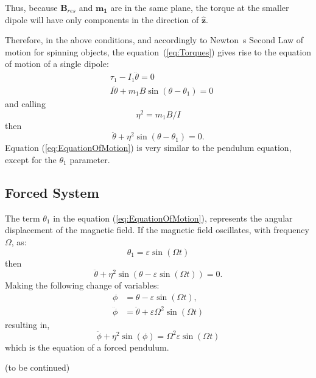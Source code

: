 Thus, because $\boldsymbol{B}_{res}$ and $\boldsymbol{m_1}$ are in the same plane, the torque at the smaller dipole will have only components in the direction of $\boldsymbol{\hat{z}}$.

Therefore, in the above conditions, and accordingly to Newton~\textquotesingle s Second Law of motion for spinning objects, the equation~(\ref{eq:Torques}) gives rise to the equation of motion of a single dipole:
\begin{equation}
    \begin{aligned}
        &\tau_1 - I_1 \ddot{\theta} = 0\\
        &I \ddot{\theta} + m_1 B \sin(\theta - \theta_1) = 0        
    \end{aligned}
\end{equation}
and calling
\begin{equation}
    \eta^2 = m_1 B/I 
\end{equation} 
then
\begin{equation}
    \ddot{\theta} +\eta^2 \sin(\theta - \theta_1) = 0.
    \label{eq:EquationOfMotion}
\end{equation}
Equation (\ref{eq:EquationOfMotion}) is very similar to the pendulum equation, except for the $\theta_1$ parameter.
\subsection{Forced System}
The term $\theta_1$ in the equation (\ref{eq:EquationOfMotion}), represents the angular displacement of the magnetic field. If the magnetic field oscillates, with frequency $\Omega$, as:
\begin{equation}
    \theta_1 = \varepsilon \sin(\Omega t)
\end{equation}
then
\begin{equation}
    \ddot{\theta} +\eta^2 \sin(\theta - \varepsilon \sin(\Omega t)) = 0.
\end{equation}
Making the following change of variables:
\begin{equation}
    \begin{aligned}
        \phi &= \theta - \varepsilon \sin(\Omega t),\\
        \ddot{\phi} &= \ddot{\theta} + \varepsilon \Omega^2 \sin(\Omega t)
    \end{aligned}
\end{equation}
resulting in, 
\begin{equation}
    \ddot{\phi} + \eta^2 \sin(\phi) =\Omega^2 \varepsilon \sin(\Omega t)
\end{equation}
which is the equation of a forced pendulum.

(to be continued)
